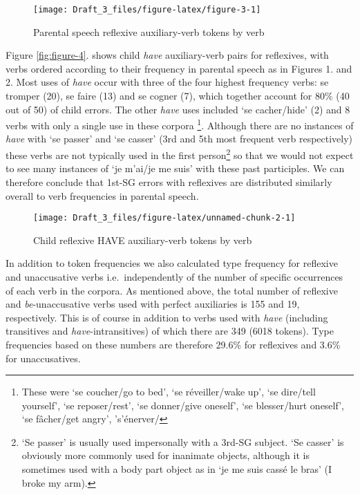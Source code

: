 \documentclass[
  12pt,
]{article}
\begin{document}
\begin{enumerate}[resume*]
\begin{enumerate}[resume*]
\begin{enumerate}[resume*]
\begin{enumerate}[resume*]
\begin{enumerate}[resume*]
\begin{figure}

{\centering \texttt{[image: Draft\_3\_files/figure-latex/figure-3-1]} 

}

\caption{Parental speech reflexive auxiliary-verb tokens by verb}\label{fig:figure-3}
\end{figure}

Figure \ref{fig:figure-4}. shows child \emph{have} auxiliary-verb pairs for reflexives, with verbs ordered according to their frequency in parental speech as in Figures 1. and 2. Most uses of \emph{have} occur with three of the four highest frequency verbs: se tromper (20), se faire (13) and se cogner (7), which together account for 80\% (40 out of 50) of child errors. The other \emph{have} uses included `se cacher/hide' (2) and 8 verbs with only a single use in these corpora \footnote{These were `se coucher/go to bed', `se réveiller/wake up', `se dire/tell yourself', `se reposer/rest', `se donner/give oneself', `se blesser/hurt oneself', `se fâcher/get angry', 's'énerver/}. Although there are no instances of \emph{have} with `se passer' and `se casser' (3rd and 5th most frequent verb respectively) these verbs are not typically used in the first person\footnote{`Se passer' is usually used impersonally with a 3rd-SG subject. `Se casser' is obviously more commonly used for inanimate objects, although it is sometimes used with a body part object as in `je me suis cassé le bras' (I broke my arm).} so that we would not expect to see many instances of `je m'ai/je me suis' with these past participles. We can therefore conclude that 1st-SG errors with reflexives are distributed similarly overall to verb frequencies in parental speech.

\begin{figure}

{\centering \texttt{[image: Draft\_3\_files/figure-latex/unnamed-chunk-2-1]} 

}

\caption{\label{fig:figure-4}Child reflexive HAVE auxiliary-verb tokens by verb}\label{fig:unnamed-chunk-2}
\end{figure}

In addition to token frequencies we also calculated type frequency for reflexive and unaccusative verbs i.e.~independently of the number of specific occurrences of each verb in the corpora. As mentioned above, the total number of reflexive and \emph{be}-unaccusative verbs used with perfect auxiliaries is 155 and 19, respectively. This is of course in addition to verbs used with \emph{have} (including transitives and \emph{have}-intransitives) of which there are 349 (6018 tokens). Type frequencies based on these numbers are therefore 29.6\% for reflexives and 3.6\% for unaccusatives.


\end{enumerate}
\end{enumerate}
\end{enumerate}
\end{enumerate}
\end{enumerate}
\end{document}

